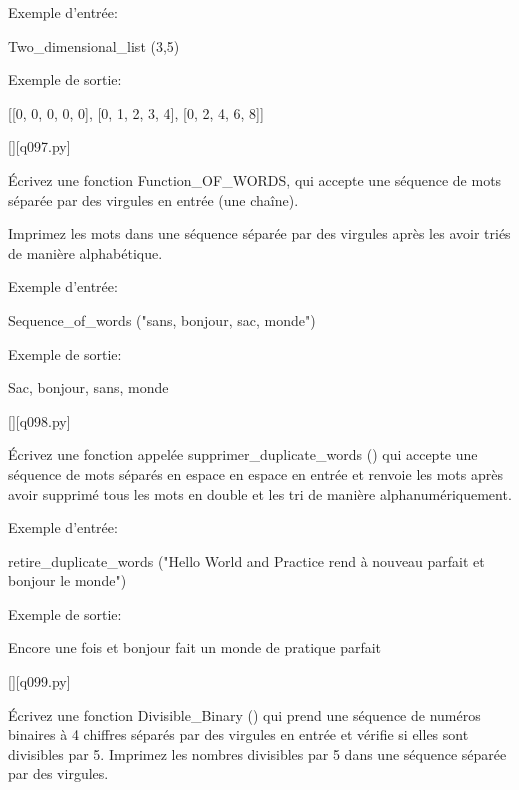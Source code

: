 Exemple d'entrée:

Two\_dimensional\_list (3,5)

Exemple de sortie:

[[0, 0, 0, 0, 0], [0, 1, 2, 3, 4], [0, 2, 4, 6, 8]]
        \par
        \renewcommand{\nomfichier}{q097.py}
        \begin{solution}
            \pythonfile{\chemincode \nomfichier}[][\nomfichier]
        \end{solution}
        

        \question
        Écrivez une fonction Function\_OF\_WORDS, qui accepte une séquence de mots séparée par des virgules en entrée (une chaîne).

Imprimez les mots dans une séquence séparée par des virgules après les avoir triés de manière alphabétique.

Exemple d'entrée:

Sequence\_of\_words ("sans, bonjour, sac, monde")

Exemple de sortie:

Sac, bonjour, sans, monde
        \par
        \renewcommand{\nomfichier}{q098.py}
        \begin{solution}
            \pythonfile{\chemincode \nomfichier}[][\nomfichier]
        \end{solution}
        

        \question
        Écrivez une fonction appelée supprimer\_duplicate\_words () qui accepte une séquence de mots séparés en espace en espace en entrée et renvoie les mots après avoir supprimé tous les mots en double et les tri de manière alphanumériquement.

Exemple d'entrée:

retire\_duplicate\_words ("Hello World and Practice rend à nouveau parfait et bonjour le monde")

Exemple de sortie:

Encore une fois et bonjour fait un monde de pratique parfait
        \par
        \renewcommand{\nomfichier}{q099.py}
        \begin{solution}
            \pythonfile{\chemincode \nomfichier}[][\nomfichier]
        \end{solution}
        

        \question
        Écrivez une fonction Divisible\_Binary () qui prend une séquence de numéros binaires à 4 chiffres séparés par des virgules en entrée et vérifie si elles sont divisibles par 5. Imprimez les nombres divisibles par 5 dans une séquence séparée par des virgules.

